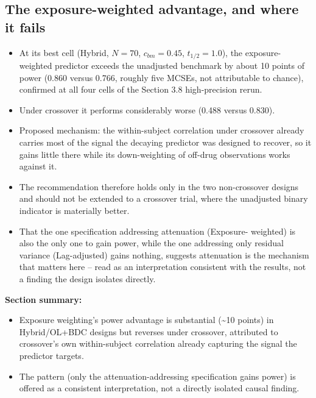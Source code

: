 \documentclass[
  11pt,
]{article}
\providecommand{\tightlist}{%
  \setlength{\itemsep}{0pt}\setlength{\parskip}{0pt}}
\begin{document}
\subsection{The exposure-weighted advantage, and where it fails}\label{the-exposure-weighted-advantage-and-where-it-fails}

\begin{itemize}
\tightlist
\item
  At its best cell (Hybrid, \(N=70\), \(c_{bm}=0.45\), \(t_{1/2}=1.0\)), the
  exposure-weighted predictor exceeds the unadjusted benchmark by
  about 10 points of power (0.860 versus 0.766, roughly five MCSEs,
  not attributable to chance), confirmed at all four cells of the
  Section 3.8 high-precision rerun.
\item
  Under crossover it performs considerably worse (0.488 versus
  0.830).
\item
  Proposed mechanism: the within-subject correlation under crossover
  already carries most of the signal the decaying predictor was
  designed to recover, so it gains little there while its
  down-weighting of off-drug observations works against it.
\item
  The recommendation therefore holds only in the two non-crossover
  designs and should not be extended to a crossover trial, where the
  unadjusted binary indicator is materially better.
\item
  That the one specification addressing attenuation (Exposure-
  weighted) is also the only one to gain power, while the one
  addressing only residual variance (Lag-adjusted) gains nothing,
  suggests attenuation is the mechanism that matters here -- read as
  an interpretation consistent with the results, not a finding the
  design isolates directly.
\end{itemize}

\textbf{Section summary:}

\begin{itemize}
\tightlist
\item
  Exposure weighting's power advantage is substantial (\textasciitilde10 points) in
  Hybrid/OL+BDC designs but reverses under crossover, attributed to
  crossover's own within-subject correlation already capturing the
  signal the predictor targets.
\item
  The pattern (only the attenuation-addressing specification gains
  power) is offered as a consistent interpretation, not a directly
  isolated causal finding.
\end{itemize}
\end{document}
